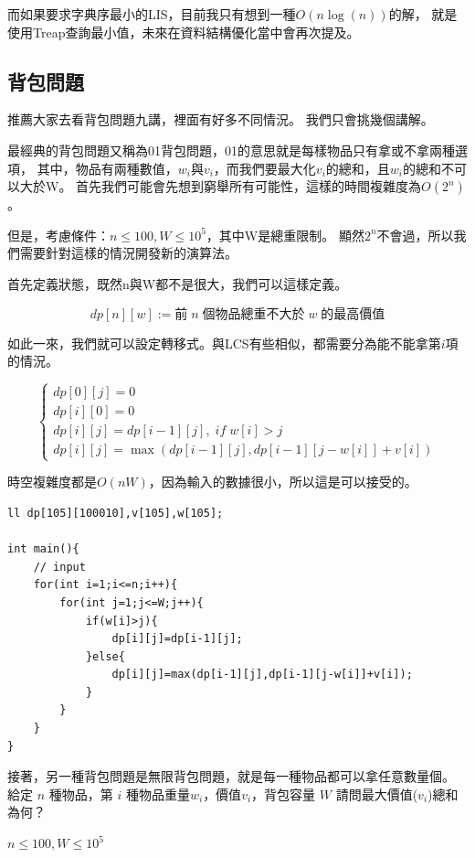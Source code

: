     而如果要求字典序最小的LIS，目前我只有想到一種$O(n \log(n))$的解，
    就是使用Treap查詢最小值，未來在資料結構優化當中會再次提及。

    \subsection{背包問題}

    推薦大家去看背包問題九講，裡面有好多不同情況。
    我們只會挑幾個講解。

    最經典的背包問題又稱為01背包問題，01的意思就是每樣物品只有拿或不拿兩種選項，
    其中，物品有兩種數值，$w_i$與$v_i$，而我們要最大化$v_i$的總和，且$w_i$的總和不可以大於W。
    首先我們可能會先想到窮舉所有可能性，這樣的時間複雜度為$O(2^n)$。

    但是，考慮條件：$n \le 100, W \le 10^5$，其中W是總重限制。
    顯然$2^n$不會過，所以我們需要針對這樣的情況開發新的演算法。

    首先定義狀態，既然n與W都不是很大，我們可以這樣定義。

    $$dp[n][w] := 前 \; n \; 個物品總重不大於 \; w \; 的最高價值$$

    如此一來，我們就可以設定轉移式。與LCS有些相似，都需要分為能不能拿第$i$項的情況。

    $$
    \begin{cases}
        dp[0][j] = 0 \\
        dp[i][0] = 0 \\
        dp[i][j]=dp[i-1][j], \; if \; w[i]>j \\
        dp[i][j]=\max(dp[i-1][j],dp[i-1][j-w[i]]+v[i])
    \end{cases}
    $$

    時空複雜度都是$O(nW)$，因為輸入的數據很小，所以這是可以接受的。

\begin{lstlisting}[caption=01背包]
ll dp[105][100010],v[105],w[105];

int main(){
    // input
    for(int i=1;i<=n;i++){
        for(int j=1;j<=W;j++){
            if(w[i]>j){
                dp[i][j]=dp[i-1][j];
            }else{
                dp[i][j]=max(dp[i-1][j],dp[i-1][j-w[i]]+v[i]);
            }
        }
    }
}
\end{lstlisting}
    
    接著，另一種背包問題是無限背包問題，就是每一種物品都可以拿任意數量個。
    給定 $n$ 種物品，第 $i$ 種物品重量$w_i$，價值$v_i$，背包容量 $W$
    請問最大價值($v_i$)總和為何？
    
    $n \le 100, W \le 10^5$

